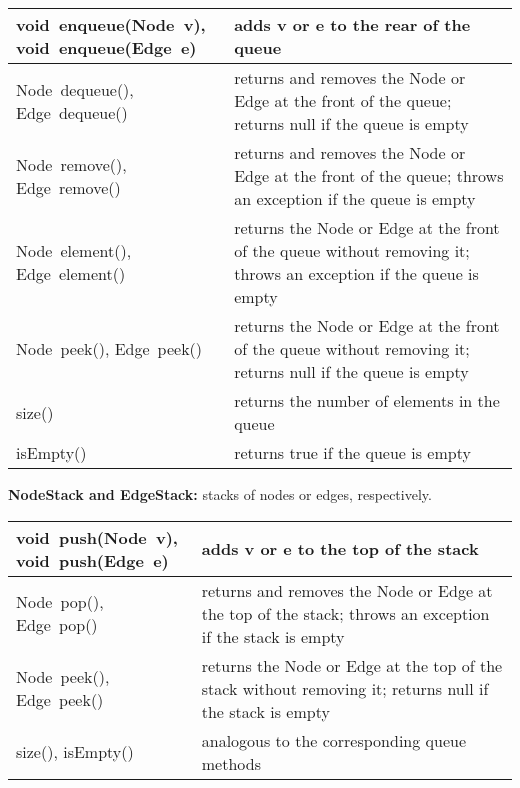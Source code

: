 \begin{table}
  \medskip
  \begin{tabular}{| m{} | m{} |}
    \hline
    \shortstack[l]{
      \textsf{void~enqueue(Node~v)},\\
      \textsf{void~enqueue(Edge~e)}
    }
    &
    adds \textsf{v} or \textsf{e} to the rear of the queue
    \\ \hline
    \textsf{Node~dequeue()}, \textsf{Edge~dequeue()}
    &
    returns and removes the \textsf{Node} or \textsf{Edge} at the front of the queue;
    returns \textsf{null} if the queue is empty
    \\ \hline
    \textsf{Node~remove()}, \textsf{Edge~remove()}
    &
    returns and removes the \textsf{Node} or \textsf{Edge} at the front of the queue;
    throws an exception if the queue is empty
    \\ \hline
    \textsf{Node~element()}, \textsf{Edge~element()}
    &
    returns the \textsf{Node} or \textsf{Edge} at the front of the queue
    without removing it;
    throws an exception if the queue is empty
    \\ \hline
    \textsf{Node~peek()}, \textsf{Edge~peek()}
    &
    returns the \textsf{Node} or \textsf{Edge} at the front of the queue
    without removing it;
    returns \textsf{null} if the queue is empty
    \\ \hline
    \textsf{size()}
    &
    returns the number of elements in the queue
    \\ \hline
    \textsf{isEmpty()}
    &
    returns \textsf{true} if the queue is empty 
    \\ \hline
  \end{tabular}

  \bigskip
  \textbf{NodeStack and EdgeStack:} stacks of nodes or edges, respectively.

  \medskip
  \begin{tabular}{| m{} | m{} |}
    \hline
    \shortstack[l]{
      \textsf{void~push(Node~v)},\\
      \textsf{void~push(Edge~e)}
    }
    &
    adds \textsf{v} or \textsf{e} to the top of the stack
    \\ \hline
    \textsf{Node~pop()}, \textsf{Edge~pop()}
    &
    returns and removes the \textsf{Node} or \textsf{Edge} at the top of the stack;
    throws an exception if the stack is empty
    \\ \hline
    \textsf{Node~peek()}, \textsf{Edge~peek()}
    &
    returns the \textsf{Node} or \textsf{Edge} at the top of the stack
    without removing it;
    returns null if the stack is empty
    \\ \hline
    \textsf{size()}, \textsf{isEmpty()}
    &
    analogous to the corresponding queue methods
    \\ \hline
  \end{tabular}


\end{table}
